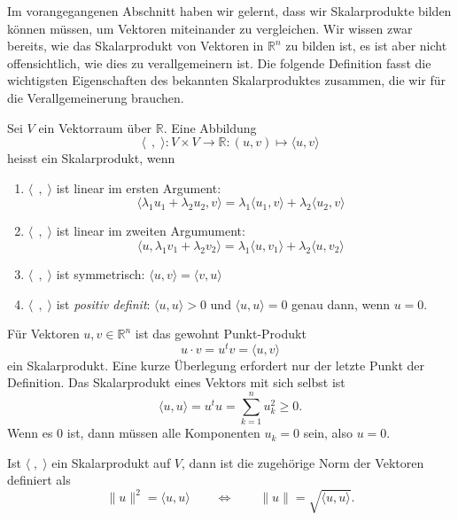 Im vorangegangenen Abschnitt haben wir gelernt, dass wir Skalarprodukte
bilden können müssen, um Vektoren miteinander zu vergleichen.
Wir wissen zwar bereits, wie das Skalarprodukt von Vektoren in 
$\mathbb R^n$ zu bilden ist, es ist aber nicht offensichtlich, wie
dies zu verallgemeinern ist.
Die folgende Definition fasst die wichtigsten Eigenschaften des
bekannten Skalarproduktes zusammen, die wir für die Verallgemeinerung
brauchen.

\begin{definition}
Sei $V$ ein Vektorraum über $\mathbb R$.
Eine Abbildung
\[
\langle\;\,,\;\rangle
\colon
V\times V\to\mathbb R
:
(u,v)\mapsto \langle u,v\rangle
\]
heisst ein Skalarprodukt, wenn
\begin{enumerate}
\item $\langle\;\,,\;\rangle$ ist linear im ersten Argument:
\begin{equation}
\langle \lambda_1 u_1+\lambda_2 u_2,v\rangle
=
\lambda_1 \langle u_1,v\rangle
+
\lambda_2 \langle u_2,v\rangle
\end{equation}
\item $\langle\;\,,\;\rangle$ ist linear im zweiten Argumument:
\begin{equation}
\langle u,\lambda_1 v_1+\lambda_2 v_2\rangle
=
\lambda_1 \langle u,v_1\rangle
+
\lambda_2 \langle u,v_2\rangle
\end{equation}
\item
$\langle\;\,,\;\rangle$
ist symmetrisch:
$\langle u,v\rangle=\langle v,u\rangle$
\item
$\langle\;\,,\;\rangle$
ist {\em positiv definit}: $\langle u,u\rangle > 0$ und
$\langle u,u\rangle=0$ genau dann, wenn $u=0$.
\end{enumerate}
\end{definition}

Für Vektoren $u,v\in\mathbb R^n$ ist das gewohnt Punkt-Produkt
\[
u\cdot v = u^t v = \langle u,v\rangle
\]
ein Skalarprodukt.
Eine kurze Überlegung erfordert nur der letzte Punkt der Definition.
Das Skalarprodukt eines Vektors mit sich selbst ist 
\[
\langle u,u\rangle = u^t u = \sum_{k=1}^n u_k^2 \ge 0.
\]
Wenn es $0$ ist, dann müssen alle Komponenten $u_k=0$ sein, also $u=0$.

\begin{definition}
Ist $\langle\;,\;\rangle$ ein Skalarprodukt auf $V$, dann ist die zugehörige
Norm der Vektoren definiert als
\[
\| u \|^2 = \langle u,u\rangle
\qquad\Leftrightarrow\qquad
\| u\| = \sqrt{\langle u,u\rangle}.
\]
\end{definition}

